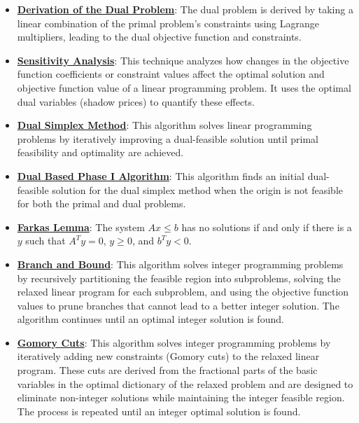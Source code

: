 \documentclass{article}%
\begin{document}
\begin{itemize}[leftmargin=*]%
\item \href{https://www.math.purdue.edu/~yipn/421//2024-10-01-DualGeneralLP.pdf#page=1}{\textbf{Derivation of the Dual Problem}}: The dual problem is derived by taking a linear combination of the primal problem's constraints using Lagrange multipliers, leading to the dual objective function and constraints.%
\end{itemize}%
\begin{itemize}[leftmargin=*]%
\item \href{https://www.math.purdue.edu/~yipn/421//2024-10-01-SensitivityDuality.pdf#page=7}{\textbf{Sensitivity Analysis}}: This technique analyzes how changes in the objective function coefficients or constraint values affect the optimal solution and objective function value of a linear programming problem.  It uses the optimal dual variables (shadow prices) to quantify these effects.%
\end{itemize}%
\begin{itemize}[leftmargin=*]%
\item \href{https://www.math.purdue.edu/~yipn/421//2024-10-03-DualSimplexMatrix.pdf#page=2}{\textbf{Dual Simplex Method}}: This algorithm solves linear programming problems by iteratively improving a dual-feasible solution until primal feasibility and optimality are achieved.%
\item \href{https://www.math.purdue.edu/~yipn/421//2024-10-03-DualSimplexMatrix.pdf#page=5}{\textbf{Dual Based Phase I Algorithm}}: This algorithm finds an initial dual-feasible solution for the dual simplex method when the origin is not feasible for both the primal and dual problems.%
\end{itemize}%
\begin{itemize}[leftmargin=*]%
\item \href{https://www.math.purdue.edu/~yipn/421//2024-10-28-Farkas.pdf#page=1}{\textbf{Farkas Lemma}}: The system $Ax \le b$ has no solutions if and only if there is a $y$ such that $A^T y = 0$, $y \ge 0$, and $b^T y < 0$.%
\end{itemize}%
\begin{itemize}[leftmargin=*]%
\item \href{https://www.math.purdue.edu/~yipn/421//2024-10-31-IntLinProg.pdf#page=5}{\textbf{Branch and Bound}}: This algorithm solves integer programming problems by recursively partitioning the feasible region into subproblems, solving the relaxed linear program for each subproblem, and using the objective function values to prune branches that cannot lead to a better integer solution.  The algorithm continues until an optimal integer solution is found.%
\item \href{https://www.math.purdue.edu/~yipn/421//2024-10-31-IntLinProg.pdf#page=15}{\textbf{Gomory Cuts}}: This algorithm solves integer programming problems by iteratively adding new constraints (Gomory cuts) to the relaxed linear program.  These cuts are derived from the fractional parts of the basic variables in the optimal dictionary of the relaxed problem and are designed to eliminate non-integer solutions while maintaining the integer feasible region. The process is repeated until an integer optimal solution is found.%
\end{itemize}%
\end{document}
